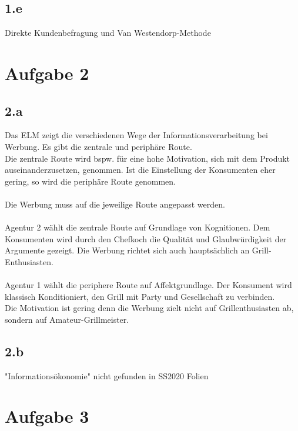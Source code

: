 \subsection*{1.e}
    Direkte Kundenbefragung und Van Westendorp-Methode

\section*{Aufgabe 2}
\subsection*{2.a}
    Das ELM zeigt die verschiedenen Wege der Informationsverarbeitung bei Werbung. Es gibt die zentrale und periphäre Route. \\
    Die zentrale Route wird bspw. für eine hohe Motivation, sich mit dem Produkt auseinanderzusetzen, genommen.
    Ist die Einstellung der Konsumenten eher gering, so wird die periphäre Route genommen. \\
    \ \\
    Die Werbung muss auf die jeweilige Route angepasst werden. \\
    \ \\
    Agentur 2 wählt die zentrale Route auf Grundlage von Kognitionen. Dem Konsumenten wird durch den Chefkoch die Qualität und Glaubwürdigkeit der Argumente gezeigt.
    Die Werbung richtet sich auch hauptsächlich an Grill-Enthusiasten. \\
    \ \\
    Agentur 1 wählt die periphere Route auf Affektgrundlage. Der Konsument wird klassisch Konditioniert, den Grill mit Party und Gesellschaft zu verbinden. \\
    Die Motivation ist gering denn die Werbung zielt nicht auf Grillenthusiasten ab, sondern auf Amateur-Grillmeister.

\subsection*{2.b}
    "Informationsökonomie" nicht gefunden in SS2020 Folien

\section*{Aufgabe 3}
